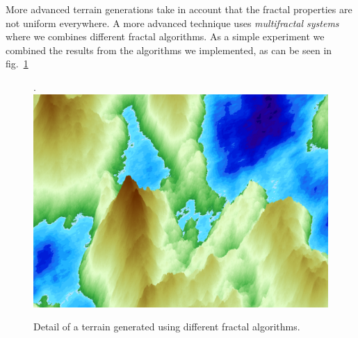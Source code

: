 More advanced terrain generations take in account that the fractal properties are not uniform everywhere. A more advanced technique uses {\em multifractal systems} where we combines different fractal algorithms. As a simple experiment we combined the results from the  algorithms we implemented, as can be seen in fig.~\ref{fig:full} \begin{figure}[htb].
\centering
    \includegraphics[width=\textwidth]{img/big.png}
    \caption{\label{fig:full} Detail of a terrain generated using different fractal algorithms. }
\end{figure}
\pagebreak
\FloatBarrier


\renewcommand{\bibname}{References}
